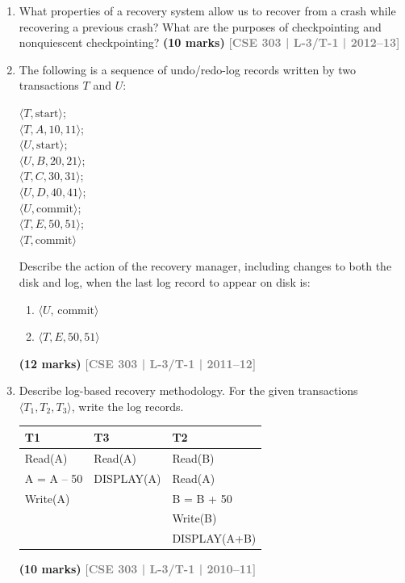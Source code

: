 \documentclass[12pt]{article}
\newcommand{\yr}[1]{\hfill\textcolor{gray}{\small\textbf{[#1]}}}
\newcommand{\mk}[1]{\textcolor{orange!70!black}{\small\textbf{(#1 marks)}}}
\begin{document}
\begin{enumerate}
\item What properties of a recovery system allow us to recover from a crash while recovering a previous crash? What are the purposes of checkpointing and nonquiescent checkpointing?
\mk{10} \yr{CSE 303 | L-3/T-1 | 2012--13}


\item The following is a sequence of undo/redo-log records written by two transactions $T$ and $U$:
\begin{center}
\small\ttfamily
$\langle T,\text{start}\rangle$; \\
$\langle T,A,10,11\rangle$; \\
$\langle U,\text{start}\rangle$; \\
$\langle U,B,20,21\rangle$; \\
$\langle T,C,30,31\rangle$; \\
$\langle U,D,40,41\rangle$; \\
$\langle U,\text{commit}\rangle$; \\
$\langle T,E,50,51\rangle$; \\
$\langle T,\text{commit}\rangle$
\end{center}
Describe the action of the recovery manager, including changes to both the disk and log, when the last log record to appear on disk is:
\begin{enumerate}
  \item $\langle U,\,\text{commit}\rangle$
  \item $\langle T,E,50,51\rangle$
\end{enumerate}
  \mk{12} \yr{CSE 303 | L-3/T-1 | 2011--12}


\item Describe log-based recovery methodology. For the given transactions $\langle T_1, T_2, T_3 \rangle$, write the log records.

\medskip
\begin{center}
\begin{tabular}{lll}
\toprule
\textbf{T1} & \textbf{T3} & \textbf{T2}\\
\midrule
Read(A)      & Read(A)     & Read(B)\\
A = A -- 50  & DISPLAY(A)  & Read(A)\\
Write(A)     &             & B = B + 50\\
             &             & Write(B)\\
             &             & DISPLAY(A+B)\\
\bottomrule
\end{tabular}
\end{center}
\mk{10} \yr{CSE 303 | L-3/T-1 | 2010--11}


\end{enumerate}
\end{document}
